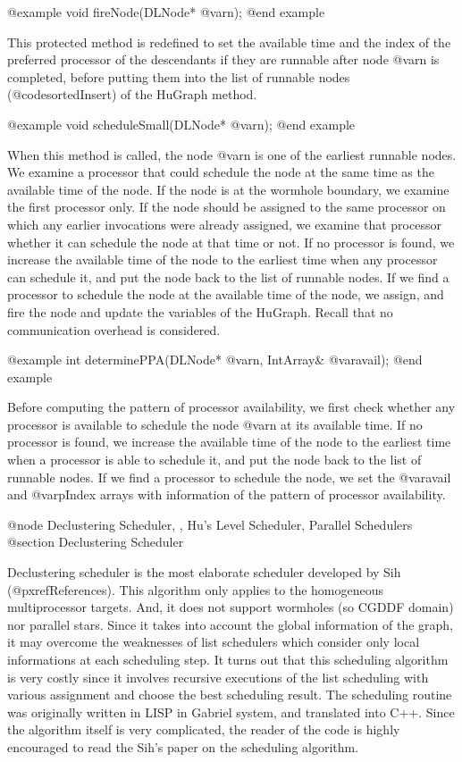 @example
void fireNode(DLNode* @var{n});
@end example

This protected method is redefined to set the available time and the index
of the preferred processor of the descendants if they are runnable after node
@var{n} is completed, before putting them into the list of runnable nodes
(@code{sortedInsert}) of the HuGraph method.

@example
void scheduleSmall(DLNode* @var{n});
@end example

When this method is called, the node @var{n} is one of the earliest
runnable nodes. We examine a processor that could schedule the node
at the same time as the available time of the node. If the node
is at the wormhole boundary, we examine the first processor only. If
the node should be assigned to the same processor on which any earlier
invocations were already assigned, we examine that processor whether
it can schedule the node at that time or not. If no processor is found,
we increase the available time of the node to the earliest time when
any processor can schedule it, and put the node back to the list of
runnable nodes. If we find a processor to schedule the node at
the available time of the node, we assign, and fire the node and
update the variables of the HuGraph. Recall that no communication
overhead is considered.

@example
int determinePPA(DLNode* @var{n}, IntArray& @var{avail});
@end example

Before computing the pattern of processor availability, we first check
whether any processor is available to schedule the node @var{n} at its
available time. If no processor is found, we increase the available time
of the node to the earliest time when a processor is able to schedule it,
and put the node back to the list of runnable nodes.
If we find a processor to schedule the node, we set the @var{avail} and
@var{pIndex} arrays with information of the pattern of processor availability.

@node Declustering Scheduler, , Hu's Level Scheduler, Parallel Schedulers
@section Declustering Scheduler

Declustering scheduler is the most elaborate scheduler developed by Sih
(@pxref{References}). This algorithm only applies to the homogeneous
multiprocessor targets. And, it does not support wormholes (so CGDDF domain)
nor parallel stars. Since it takes into account the global information
of the graph, it may overcome the weaknesses of list schedulers which
consider only local informations at each scheduling step. It turns out
that this scheduling algorithm is very costly since it involves
recursive executions of the list scheduling with various assignment
and choose the best scheduling result. The scheduling routine was
originally written in LISP in Gabriel system, and translated into
C++. Since the algorithm itself is very complicated, the reader of the code
is highly encouraged to read the Sih's paper on the scheduling algorithm.

